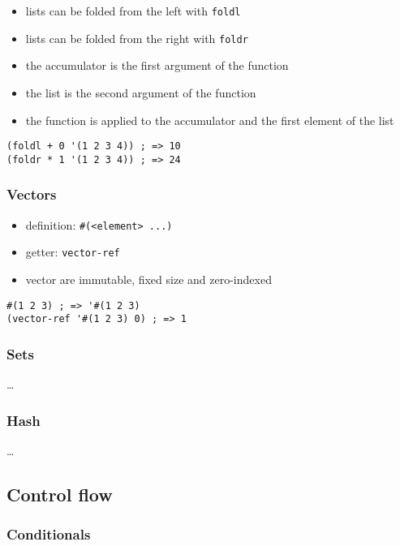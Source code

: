\documentclass[a4paper,landscape,10pt]{article}
\begin{document}
\begin{multicols*}{2}
  \begin{itemize}
    \item lists can be folded from the left with \texttt{foldl}
    \item lists can be folded from the right with \texttt{foldr}
    \item the accumulator is the first argument of the function
    \item the list is the second argument of the function
    \item the function is applied to the accumulator and the first element of the list
  \end{itemize}

  \begin{lstlisting}[language=Racket]
(foldl + 0 '(1 2 3 4)) ; => 10
(foldr * 1 '(1 2 3 4)) ; => 24
  \end{lstlisting}

  \subsubsection{Vectors}

  \begin{itemize}
    \item definition: \texttt{\#(<element> ...)}
    \item getter: \texttt{vector-ref}
    \item vector are immutable, fixed size and zero-indexed
  \end{itemize}

  \begin{lstlisting}[language=Racket]
#(1 2 3) ; => '#(1 2 3)
(vector-ref '#(1 2 3) 0) ; => 1
  \end{lstlisting}

  \subsubsection{Sets}

  \dots

  \subsubsection{Hash}

  \dots

  \subsection{Control flow}

  \subsubsection{Conditionals}


\end{multicols*}
\end{document}
